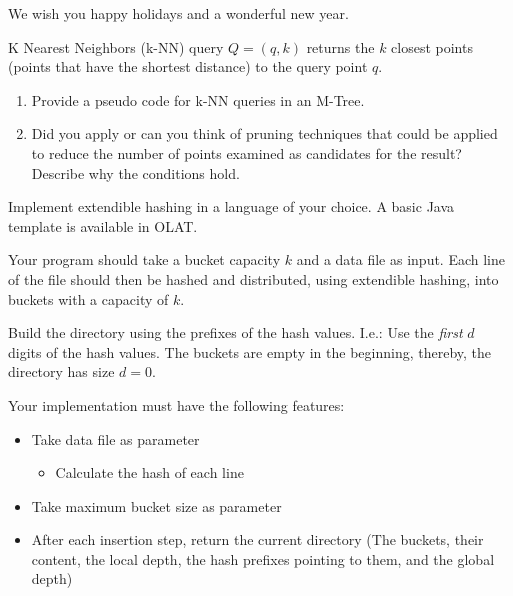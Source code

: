 


\newcommand{\subtitle}{\textbf{Exercise 8}}
\newcommand{\outdate}{11.12.2023}
\newcommand{\duedate}{01.01.2024 12:00 MEZ}
\newcommand{\video}{040}






\begin{center}
\textsf{We wish you happy holidays and a wonderful new year.}
\end{center}


K Nearest Neighbors (k-NN) query $Q=(q, k)$ returns the $k$ closest points (points that have the shortest distance) to the query point $q$.

\begin{enumerate}
\item Provide a pseudo code for k-NN queries in an M-Tree.

\item Did you apply or can you think of pruning techniques that could be applied to reduce the number of points examined as candidates for the result? Describe why the conditions hold. 

\end{enumerate}


Implement extendible hashing in a language of your choice. A basic Java template is available in OLAT.

Your program should take a bucket capacity $k$ and a data file as input.
Each line of the file should then be hashed and distributed, using extendible hashing, into buckets with a capacity of $k$.

Build the directory using the prefixes of the hash values.
I.e.: Use the \emph{first} $d$ digits of the hash values.
The buckets are empty in the beginning, thereby, the directory has size $d=0$.

Your implementation must have the following features:
\begin{itemize}
\item Take data file as parameter
\begin{itemize}
  \item Calculate the hash of each line
\end{itemize}
\item Take maximum bucket size as parameter
\item After each insertion step, return the current directory (The buckets, their content, the local depth, the hash prefixes pointing to them, and the global depth)
\end{itemize}

